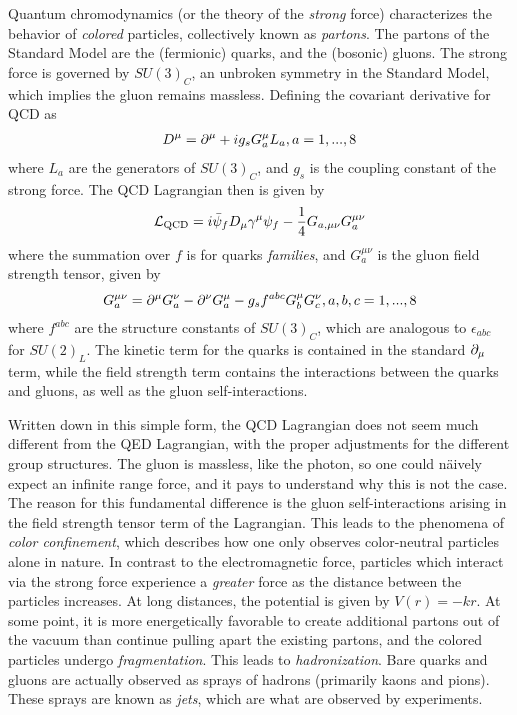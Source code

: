 Quantum chromodynamics (or the theory of the \textit{strong} force) characterizes the behavior of \textit{colored} particles, collectively known as \textit{partons}.
The partons of the Standard Model are the (fermionic) quarks, and the (bosonic) gluons.
The strong force is governed by $SU(3)_C$, an unbroken symmetry in the Standard Model, which implies the gluon remains massless.
Defining the covariant derivative for QCD as
\begin{align}
D^\mu = \partial^\mu + ig_s G^\mu_a L_a, a = 1,...,8
\end{align}
where $L_a$ are the generators of $SU(3)_C$, and $g_s$ is the coupling constant of the strong force.
The QCD Lagrangian then is given by
\begin{equation}
\mathcal{L}_{\text{QCD}} = i \bar{\psi}_f D_\mu \gamma^\mu \psi_f - \frac{1}{4} G_{a,\mu\nu} G_a^{\mu\nu}
\end{equation}
where the summation over $f$ is for quarks \textit{families}, and $ G_a^{\mu\nu}$ is the gluon field strength tensor, given by
\begin{equation}
G^{\mu\nu}_a = \partial^\mu G^\nu_a - \partial^\nu G^\mu_a - g_s f^{abc} G^\mu_b G^\nu_c, a,b,c = 1,...,8
\end{equation}
where $f^{abc}$ are the structure constants of $SU(3)_C$, which are analogous to $\epsilon_{abc}$ for $SU(2)_L$.
The kinetic term for the quarks is contained in the standard $\partial_\mu$ term, while the field strength term contains the interactions between the quarks and gluons, as well as the gluon self-interactions.

Written down in this simple form, the QCD Lagrangian does not seem much different from the QED Lagrangian, with the proper adjustments for the different group structures.
The gluon is massless, like the photon, so one could n\"aively expect an infinite range force, and it pays to understand why this is not the case.
The reason for this fundamental difference is the gluon self-interactions  arising in the field strength tensor term of the Lagrangian.
This leads to the phenomena of \textit{color confinement}, which describes how one only observes color-neutral particles alone in nature.
In contrast to the electromagnetic force, particles which interact via the strong force experience a \textit{greater} force as the distance between the particles increases.
At long distances, the potential is given by $V(r) = -kr$.
At some point, it is more energetically favorable to create additional partons out of the vacuum than continue pulling apart the existing partons, and the colored particles undergo \textit{fragmentation}.
This leads to \textit{hadronization}.
Bare quarks and gluons are actually observed as sprays of hadrons (primarily kaons and pions).
These sprays are known as \textit{jets}, which are what are observed by experiments.

